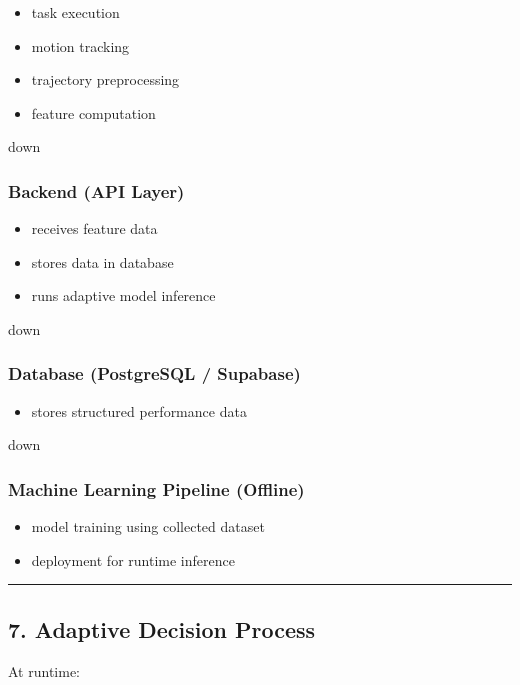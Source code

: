 \documentclass[11pt]{article}
\begin{document}
\begin{itemize}
\item task execution
\item motion tracking
\item trajectory preprocessing
\item feature computation
\end{itemize}

down


\subsubsection*{Backend (API Layer)}

\begin{itemize}
\item receives feature data
\item stores data in database
\item runs adaptive model inference
\end{itemize}

down


\subsubsection*{Database (PostgreSQL / Supabase)}

\begin{itemize}
\item stores structured performance data
\end{itemize}

down


\subsubsection*{Machine Learning Pipeline (Offline)}

\begin{itemize}
\item model training using collected dataset
\item deployment for runtime inference
\end{itemize}

\hrule


\subsection*{7. Adaptive Decision Process}


At runtime:
\end{document}
